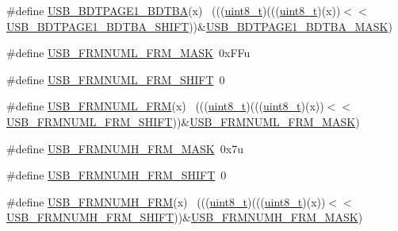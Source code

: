 \begin{DoxyCompactItemize}
\item 
\#define \hyperlink{group___u_s_b___register___masks_ga4c24d2700854ca26779e3343dc7058da}{U\+S\+B\+\_\+\+B\+D\+T\+P\+A\+G\+E1\+\_\+\+B\+D\+T\+BA}(x)                                    ~(((\hyperlink{_p_e___types_8h_aba7bc1797add20fe3efdf37ced1182c5}{uint8\+\_\+t})(((\hyperlink{_p_e___types_8h_aba7bc1797add20fe3efdf37ced1182c5}{uint8\+\_\+t})(x))$<$$<$\hyperlink{group___u_s_b___register___masks_ga50c84ff08884c9825cf6c513f11aabe4}{U\+S\+B\+\_\+\+B\+D\+T\+P\+A\+G\+E1\+\_\+\+B\+D\+T\+B\+A\+\_\+\+S\+H\+I\+FT}))\&\hyperlink{group___u_s_b___register___masks_gacd2b27fefcff6f79e930e76d2a1a7b26}{U\+S\+B\+\_\+\+B\+D\+T\+P\+A\+G\+E1\+\_\+\+B\+D\+T\+B\+A\+\_\+\+M\+A\+SK})
\item 
\#define \hyperlink{group___u_s_b___register___masks_ga197f6ef10431b69cb9b84fe7241a318a}{U\+S\+B\+\_\+\+F\+R\+M\+N\+U\+M\+L\+\_\+\+F\+R\+M\+\_\+\+M\+A\+SK}~0x\+F\+Fu
\item 
\#define \hyperlink{group___u_s_b___register___masks_ga723c2de82420db0c349049ad6f66ad14}{U\+S\+B\+\_\+\+F\+R\+M\+N\+U\+M\+L\+\_\+\+F\+R\+M\+\_\+\+S\+H\+I\+FT}~0
\item 
\#define \hyperlink{group___u_s_b___register___masks_ga5002850109b676e53ed7862ba73b6662}{U\+S\+B\+\_\+\+F\+R\+M\+N\+U\+M\+L\+\_\+\+F\+RM}(x)                                          ~(((\hyperlink{_p_e___types_8h_aba7bc1797add20fe3efdf37ced1182c5}{uint8\+\_\+t})(((\hyperlink{_p_e___types_8h_aba7bc1797add20fe3efdf37ced1182c5}{uint8\+\_\+t})(x))$<$$<$\hyperlink{group___u_s_b___register___masks_ga723c2de82420db0c349049ad6f66ad14}{U\+S\+B\+\_\+\+F\+R\+M\+N\+U\+M\+L\+\_\+\+F\+R\+M\+\_\+\+S\+H\+I\+FT}))\&\hyperlink{group___u_s_b___register___masks_ga197f6ef10431b69cb9b84fe7241a318a}{U\+S\+B\+\_\+\+F\+R\+M\+N\+U\+M\+L\+\_\+\+F\+R\+M\+\_\+\+M\+A\+SK})
\item 
\#define \hyperlink{group___u_s_b___register___masks_ga436241a677d27ecae3001b228b51f536}{U\+S\+B\+\_\+\+F\+R\+M\+N\+U\+M\+H\+\_\+\+F\+R\+M\+\_\+\+M\+A\+SK}~0x7u
\item 
\#define \hyperlink{group___u_s_b___register___masks_gacb18c63687d37e245a79d7e7551823a3}{U\+S\+B\+\_\+\+F\+R\+M\+N\+U\+M\+H\+\_\+\+F\+R\+M\+\_\+\+S\+H\+I\+FT}~0
\item 
\#define \hyperlink{group___u_s_b___register___masks_ga34958377bceb661237ecc7ff5309def7}{U\+S\+B\+\_\+\+F\+R\+M\+N\+U\+M\+H\+\_\+\+F\+RM}(x)                                          ~(((\hyperlink{_p_e___types_8h_aba7bc1797add20fe3efdf37ced1182c5}{uint8\+\_\+t})(((\hyperlink{_p_e___types_8h_aba7bc1797add20fe3efdf37ced1182c5}{uint8\+\_\+t})(x))$<$$<$\hyperlink{group___u_s_b___register___masks_gacb18c63687d37e245a79d7e7551823a3}{U\+S\+B\+\_\+\+F\+R\+M\+N\+U\+M\+H\+\_\+\+F\+R\+M\+\_\+\+S\+H\+I\+FT}))\&\hyperlink{group___u_s_b___register___masks_ga436241a677d27ecae3001b228b51f536}{U\+S\+B\+\_\+\+F\+R\+M\+N\+U\+M\+H\+\_\+\+F\+R\+M\+\_\+\+M\+A\+SK})
$$
\end{DoxyCompactItemize}
